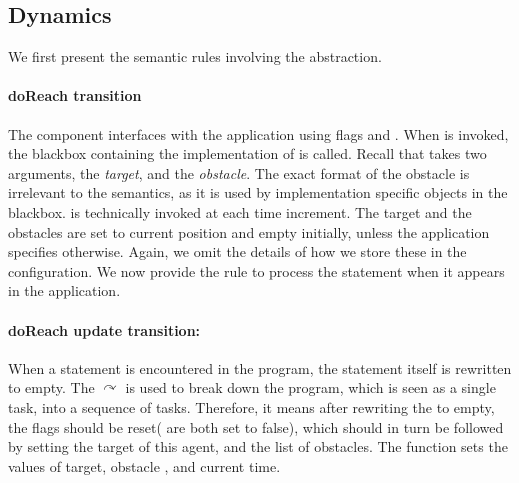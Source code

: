 \subsection{Dynamics}
\label{sect:dynamics}
We first present the semantic rules involving the  abstraction. 

\paragraph{doReach transition}
The  component interfaces with the application using flags  and . When  is invoked, the blackbox containing the implementation of  is called. Recall that  takes two arguments, the \emph{target}, and the \emph{obstacle}. The exact format of the obstacle is irrelevant to the semantics, as it is used by implementation specific objects in the  blackbox.  is technically invoked at each time increment. The target and the obstacles are set to current position and empty initially, unless the application specifies otherwise. Again, we omit the details of how we store these in the configuration. We now provide the rule to process the  statement when it appears in the application. 


\paragraph{doReach update transition: }When a  statement is encountered in the program, the statement itself is rewritten to empty. The $\curvearrowright$ is used to break down the program, which is seen as a single task, into a sequence of tasks. Therefore, it means after rewriting the  to empty, the  flags should be reset( are both set to false), which should in turn be followed by setting the target of this agent, and the list of obstacles. The  function sets the values of target, obstacle , and current time. 
\begin{figure}
\label{fig:lock1}
\end{figure}
\vspace{-2mm}
